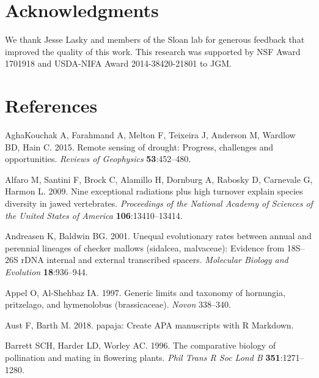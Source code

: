 \documentclass[man,floatsintext]{apa6}
\theoremstyle{definition}
\theoremstyle{definition}
\theoremstyle{definition}
\theoremstyle{remark}
\begin{document}
\hypertarget{acknowledgments}{%
\section{Acknowledgments}\label{acknowledgments}}

We thank Jesse Lasky and members of the Sloan lab for generous feedback
that improved the quality of this work. This research was supported by
NSF Award 1701918 and USDA-NIFA Award 2014-38420-21801 to JGM.

\hypertarget{references}{%
\section{References}\label{references}}

\newpage

\begingroup
\setlength{\parindent}{-0.5in}
\setlength{\leftskip}{0.5in}

\hypertarget{refs}{}
\leavevmode\hypertarget{ref-aghakouchak2015remote}{}%
AghaKouchak A, Farahmand A, Melton F, Teixeira J, Anderson M, Wardlow
BD, Hain C. 2015. Remote sensing of drought: Progress, challenges and
opportunities. \emph{Reviews of Geophysics} \textbf{53}:452--480.

\leavevmode\hypertarget{ref-R-geiger_a}{}%
Alfaro M, Santini F, Brock C, Alamillo H, Dornburg A, Rabosky D,
Carnevale G, Harmon L. 2009. Nine exceptional radiations plus high
turnover explain species diversity in jawed vertebrates.
\emph{Proceedings of the National Academy of Sciences of the United
States of America} \textbf{106}:13410--13414.

\leavevmode\hypertarget{ref-andreasen2001unequal}{}%
Andreasen K, Baldwin BG. 2001. Unequal evolutionary rates between annual
and perennial lineages of checker mallows (sidalcea, malvaceae):
Evidence from 18S--26S rDNA internal and external transcribed spacers.
\emph{Molecular Biology and Evolution} \textbf{18}:936--944.

\leavevmode\hypertarget{ref-appel1997generic}{}%
Appel O, Al-Shehbaz IA. 1997. Generic limits and taxonomy of hornungia,
pritzelago, and hymenolobus (brassicaceae). \emph{Novon} 338--340.

\leavevmode\hypertarget{ref-R-papaja}{}%
Aust F, Barth M. 2018. papaja: Create APA manuscripts with R Markdown.

\leavevmode\hypertarget{ref-barrett1996comparative}{}%
Barrett SCH, Harder LD, Worley AC. 1996. The comparative biology of
pollination and mating in flowering plants. \emph{Phil Trans R Soc Lond
B} \textbf{351}:1271--1280.
\end{document}
